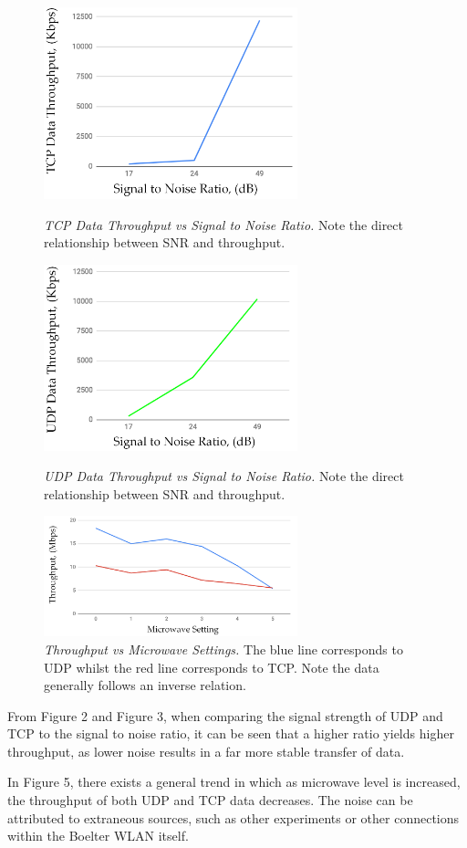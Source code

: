 \documentclass[twoside,twocolumn]{article}
\begin{document}
\begin{figure}[htbp]
    \centering
    \includegraphics[width=2.9in]{TCP.png}
    \caption{\textit{TCP Data Throughput vs Signal to Noise Ratio.} Note the direct relationship between SNR and throughput.}
    \centering
    \includegraphics[width=2.9in]{UDP.png}
    \caption{\textit{UDP Data Throughput vs Signal to Noise Ratio.} Note the direct relationship between SNR and throughput.}
    \centering
    \includegraphics[width=2.9in]{Microwave.png}
    \caption{\textit{Throughput vs Microwave Settings.} The blue line corresponds to UDP whilst the red line corresponds to TCP. Note the data generally follows an inverse relation.}
\end{figure}
\noindent From Figure 2 and Figure 3, when comparing the signal strength of UDP and TCP to the signal to noise ratio, it can be seen that a higher ratio yields higher throughput, as lower noise results in a far more stable transfer of data.

\hfill 

\noindent In Figure 5, there exists a general trend in which as microwave level is increased, the throughput of both UDP and TCP data decreases. The noise can be attributed to extraneous sources, such as other experiments or other connections within the Boelter WLAN itself.
\end{document}
